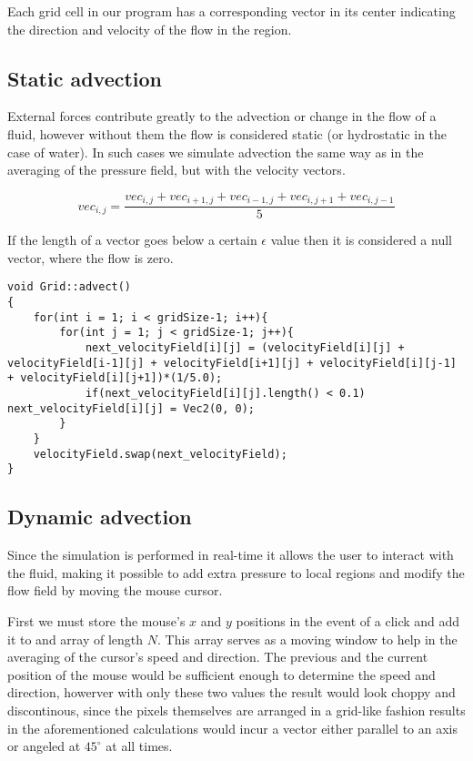 \documentclass[15pt, titlepage]{article}
\begin{document}
Each grid cell in our program has a corresponding vector in its center indicating the direction and velocity of the flow in the region.

\subsection{Static advection}

External forces contribute greatly to the advection or change in the flow of a fluid, however without them the flow is considered static (or hydrostatic in the case of water). In such cases we simulate advection the same way as in the averaging of the pressure field, but with the velocity vectors.

\[
vec_{i,j} = \frac{vec_{i,j} + vec_{i+1,j} + vec_{i-1,j} + vec_{i,j+1} + vec_{i,j-1}}{5}
\]

If the length of a vector goes below a certain $\epsilon$ value then it is considered a null vector, where the flow is zero.

\begin{lstlisting}
void Grid::advect()
{
    for(int i = 1; i < gridSize-1; i++){
        for(int j = 1; j < gridSize-1; j++){
            next_velocityField[i][j] = (velocityField[i][j] + velocityField[i-1][j] + velocityField[i+1][j] + velocityField[i][j-1] + velocityField[i][j+1])*(1/5.0);
            if(next_velocityField[i][j].length() < 0.1) next_velocityField[i][j] = Vec2(0, 0);
        }
    }
    velocityField.swap(next_velocityField);
}
\end{lstlisting}

\subsection{Dynamic advection}

Since the simulation is performed in real-time it allows the user to interact with the fluid, making it possible to add extra pressure to local regions and modify the flow field by moving the mouse cursor.

\bigskip

First we must store the mouse's $x$ and $y$ positions in the event of a click and add it to and array of length $N$. This array serves as a moving window to help in the averaging of the cursor's speed and direction. The previous and the current position of the mouse would be sufficient enough to determine the speed and direction, howerver with only these two values the result would look choppy and discontinous, since the pixels themselves are arranged in a grid-like fashion results in the aforementioned calculations would incur a vector either parallel to an axis or angeled at $45^{\circ}$ at all times.
\end{document}
